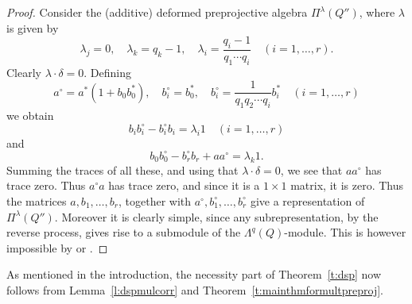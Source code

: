 \documentclass[12pt,a4paper]{amsart}
\theoremstyle{plain}
\begin{document}
\begin{proof}
Consider the (additive) deformed preprojective algebra $\Pi^\lambda(Q'')$, where $\lambda$ is given by
\[
\lambda_j = 0, \quad \lambda_k = q_k-1, \quad \lambda_i = \frac{q_i-1}{q_1\cdots q_i} \quad (i=1,\ldots,r).
\]
Clearly $\lambda\cdot\delta=0$. Defining
\[
a^\circ = a^*(1+b_0 b_0^*), \quad
b_i^\circ = b_0^*, \quad
b_i^\circ = \frac{1}{q_1 q_2\cdots q_i} b_i^* \quad (i=1,\ldots,r)
\]
we obtain
\[
b_i b_i^\circ - b_i^\circ b_i = \lambda_i 1 \quad (i=1,\ldots,r)
\]
and
\[
b_0 b_0^\circ - b_r^\circ b_r + a a^\circ = \lambda_k 1.
\]
Summing the traces of all these, and using that $\lambda\cdot\delta=0$, we see that $a a^\circ$ has trace zero. Thus $a^\circ a$ has trace zero, and since it is a $1\times 1$ matrix, it is zero. Thus the matrices $a,b_1,\ldots,b_r$, together with $a^\circ,b_1^\circ,\ldots,b_r^\circ$ give a representation of $\Pi^\lambda(Q'')$. Moreover it is clearly simple, since any subrepresentation, by the reverse process, gives rise to a submodule of the $\Lambda^q(Q)$-module. This is however impossible by \cite[Theorem 9.1]{CBmm} or \cite[Theorem 1.1]{CBHu}.
\end{proof}


As mentioned in the introduction, the necessity part of Theorem~\ref{t:dsp} now follows from Lemma~\ref{l:dspmulcorr} and Theorem~\ref{t:mainthmformultpreproj}. 
\end{document}
